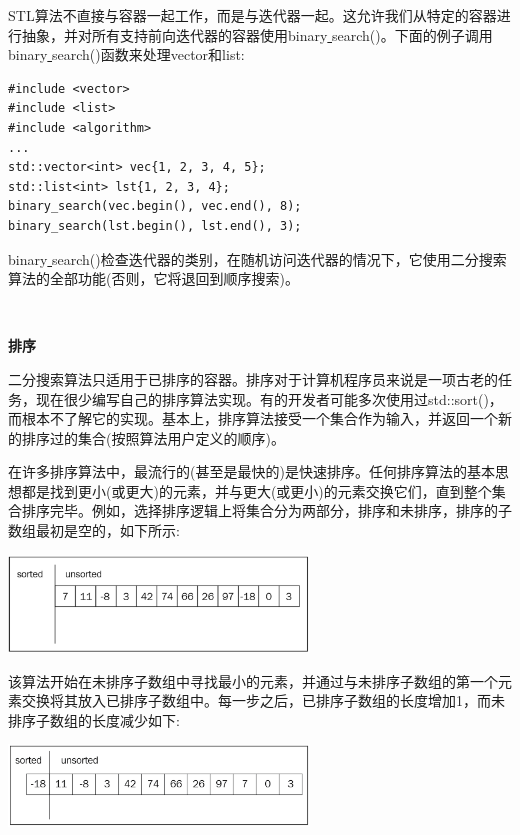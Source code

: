 STL算法不直接与容器一起工作，而是与迭代器一起。这允许我们从特定的容器进行抽象，并对所有支持前向迭代器的容器使用binary\underline{ }search()。下面的例子调用binary\underline{ }search()函数来处理vector和list: \par

\begin{lstlisting}[caption={}]
#include <vector>
#include <list>
#include <algorithm>
...
std::vector<int> vec{1, 2, 3, 4, 5};
std::list<int> lst{1, 2, 3, 4};
binary_search(vec.begin(), vec.end(), 8);
binary_search(lst.begin(), lst.end(), 3);
\end{lstlisting}

binary\underline{ }search()检查迭代器的类别，在随机访问迭代器的情况下，它使用二分搜索算法的全部功能(否则，它将退回到顺序搜索)。 \par

\noindent\textbf{}\ \par
\textbf{排序} \ \par
二分搜索算法只适用于已排序的容器。排序对于计算机程序员来说是一项古老的任务，现在很少编写自己的排序算法实现。有的开发者可能多次使用过std::sort()，而根本不了解它的实现。基本上，排序算法接受一个集合作为输入，并返回一个新的排序过的集合(按照算法用户定义的顺序)。 \par
在许多排序算法中，最流行的(甚至是最快的)是快速排序。任何排序算法的基本思想都是找到更小(或更大)的元素，并与更大(或更小)的元素交换它们，直到整个集合排序完毕。例如，选择排序逻辑上将集合分为两部分，排序和未排序，排序的子数组最初是空的，如下所示: \par

\begin{center}
	\includegraphics[width=0.6\textwidth]{content/Section-2/Chapter-6/22}
\end{center}

该算法开始在未排序子数组中寻找最小的元素，并通过与未排序子数组的第一个元素交换将其放入已排序子数组中。每一步之后，已排序子数组的长度增加1，而未排序子数组的长度减少如下: \par

\begin{center}
	\includegraphics[width=0.6\textwidth]{content/Section-2/Chapter-6/23}
\end{center}

